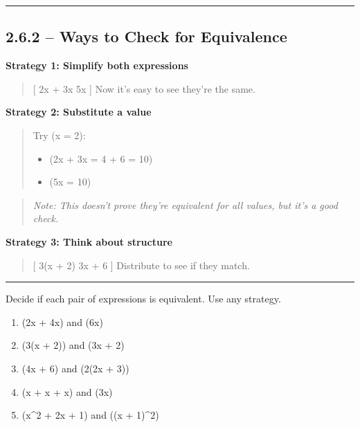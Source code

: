 \documentclass[
  letterpaper,
  DIV=11,
  numbers=noendperiod]{scrreprt}
\providecommand{\tightlist}{%
  \setlength{\itemsep}{0pt}\setlength{\parskip}{0pt}}
\begin{document}
\begin{center}\rule{0.5\linewidth}{0.5pt}\end{center}

\subsection*{2.6.2 -- Ways to Check for
Equivalence}\label{ways-to-check-for-equivalence}

\textbf{Strategy 1: Simplify both expressions}

\begin{quote}
{[} 2x + 3x \rightarrow 5x {]} Now it's easy to see they're the same.
\end{quote}

\textbf{Strategy 2: Substitute a value}

\begin{quote}
Try (x = 2):

\begin{itemize}
\tightlist
\item
  (2x + 3x = 4 + 6 = 10)\\
\item
  (5x = 10)
\end{itemize}
\end{quote}

\begin{quote}
\emph{Note: This doesn't prove they're equivalent for all values, but
it's a good check.}
\end{quote}

\textbf{Strategy 3: Think about structure}

\begin{quote}
{[} 3(x + 2)  3x + 6 {]} Distribute to see if they match.
\end{quote}

\begin{center}\rule{0.5\linewidth}{0.5pt}\end{center}

Decide if each pair of expressions is equivalent. Use any strategy.

\begin{enumerate}
\def\labelenumi{\arabic{enumi}.}
\tightlist
\item
  (2x + 4x) and (6x)\\
\item
  (3(x + 2)) and (3x + 2)\\
\item
  (4x + 6) and (2(2x + 3))\\
\item
  (x + x + x) and (3x)\\
\item
  (x\^{}2 + 2x + 1) and ((x + 1)\^{}2)
\end{enumerate}
\end{document}
